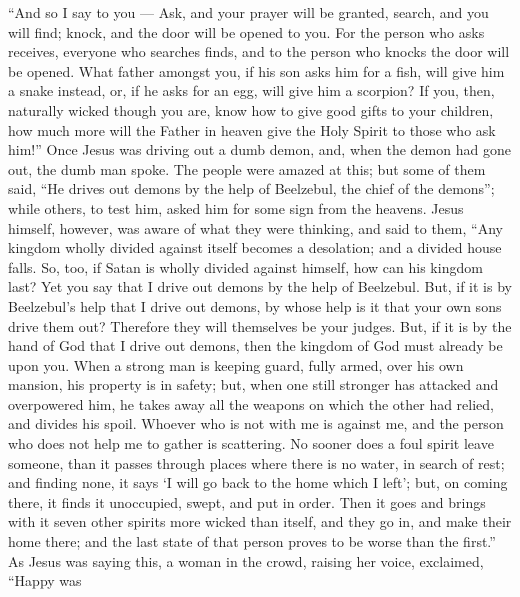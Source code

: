  ``And so I say to you --- Ask, and your prayer will be
granted, search, and you will find; knock, and the door will be opened
to you.  For the person who asks receives, everyone who
searches finds, and to the person who knocks the door will be opened.
 What father amongst you, if his son asks him for a fish,
will give him a snake instead,  or, if he asks for an egg,
will give him a scorpion?  If you, then, naturally wicked
though you are, know how to give good gifts to your children, how much
more will the Father in heaven give the Holy Spirit to those who ask
him!''  Once Jesus was driving out a dumb demon, and, when
the demon had gone out, the dumb man spoke. The people were amazed at
this;  but some of them said, ``He drives out demons by the
help of Beelzebul, the chief of the demons'';  while
others, to test him, asked him for some sign from the heavens.
 Jesus himself, however, was aware of what they were
thinking, and said to them, ``Any kingdom wholly divided against itself
becomes a desolation; and a divided house falls.  So, too,
if Satan is wholly divided against himself, how can his kingdom last?
Yet you say that I drive out demons by the help of Beelzebul.
 But, if it is by Beelzebul's help that I drive out demons,
by whose help is it that your own sons drive them out? Therefore they
will themselves be your judges.  But, if it is by the hand
of God that I drive out demons, then the kingdom of God must already be
upon you.  When a strong man is keeping guard, fully armed,
over his own mansion, his property is in safety;  but, when
one still stronger has attacked and overpowered him, he takes away all
the weapons on which the other had relied, and divides his spoil.
 Whoever who is not with me is against me, and the person
who does not help me to gather is scattering.  No sooner
does a foul spirit leave someone, than it passes through places where
there is no water, in search of rest; and finding none, it says `I will
go back to the home which I left';  but, on coming there,
it finds it unoccupied, swept, and put in order.  Then it
goes and brings with it seven other spirits more wicked than itself, and
they go in, and make their home there; and the last state of that person
proves to be worse than the first.''  As Jesus was saying
this, a woman in the crowd, raising her voice, exclaimed, ``Happy was
